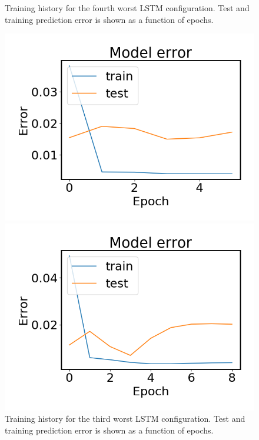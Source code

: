 \begin{figure}
\begin{minipage}[b]{0.49\linewidth}
            \caption{Training history for the fourth worst LSTM configuration. Test and training prediction error is shown as a function of epochs.}
        \end{minipage}
    \end{figure}

    \begin{figure}
        \begin{minipage}[b]{0.49\linewidth}
            \centering
            \includegraphics[width = \textwidth]{report/figures/analysis/lstm_gridsearch/worst_lstm_error_-3.png}
            \caption{Training history for the third worst LSTM configuration. Test and training prediction error is shown as a function of epochs.}
        \end{minipage}
        \hfill\vline\hfill
        \begin{minipage}[b]{0.49\linewidth}
            \centering
            \includegraphics[width = \textwidth]{report/figures/analysis/lstm_gridsearch/worst_lstm_error_-2.png}

\end{minipage}
\end{figure}
